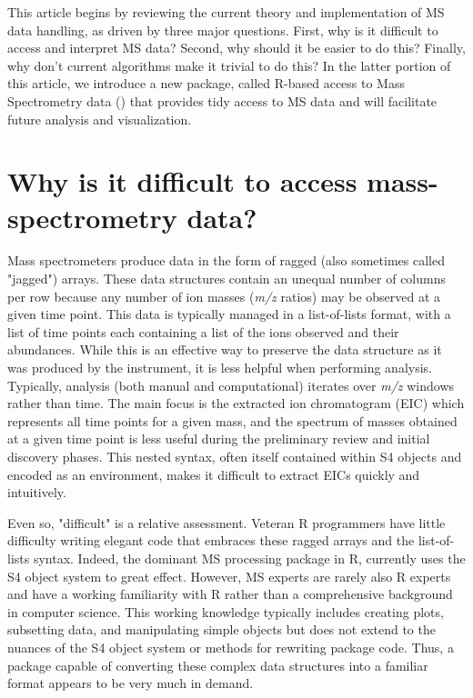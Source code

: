This article begins by reviewing the current theory and implementation of MS data handling, as driven by three major questions. First, why is it difficult to access and interpret MS data? Second, why should it be easier to do this? Finally, why don't current algorithms make it trivial to do this? In the latter portion of this article, we introduce a new package, called R-based access to Mass Spectrometry data () that provides tidy access to MS data and will facilitate future analysis and visualization.

\section{Why is it difficult to access mass-spectrometry data?}

Mass spectrometers produce data in the form of ragged (also sometimes called "jagged") arrays. These data structures contain an unequal number of columns per row because any number of ion masses (\emph{m/z} ratios) may be observed at a given time point. This data is typically managed in a list-of-lists format, with a list of time points each containing a list of the ions observed and their abundances. While this is an effective way to preserve the data structure as it was produced by the instrument, it is less helpful when performing analysis. Typically, analysis (both manual and computational) iterates over \emph{m/z} windows rather than time. The main focus is the extracted ion chromatogram (EIC) which represents all time points for a given mass, and the spectrum of masses obtained at a given time point is less useful during the preliminary review and initial discovery phases. This nested syntax, often itself contained within S4 objects and encoded as an environment, makes it difficult to extract EICs quickly and intuitively.

Even so, "difficult" is a relative assessment. Veteran R programmers have little difficulty writing elegant code that embraces these ragged arrays and the list-of-lists syntax. Indeed, the dominant MS processing package in R,  currently uses the S4 object system to great effect. However, MS experts are rarely also R experts and have a working familiarity with R rather than a comprehensive background in computer science. This working knowledge typically includes creating plots, subsetting data, and manipulating simple objects but does not extend to the nuances of the S4 object system or methods for rewriting package code. Thus, a package capable of converting these complex data structures into a familiar format appears to be very much in demand.

